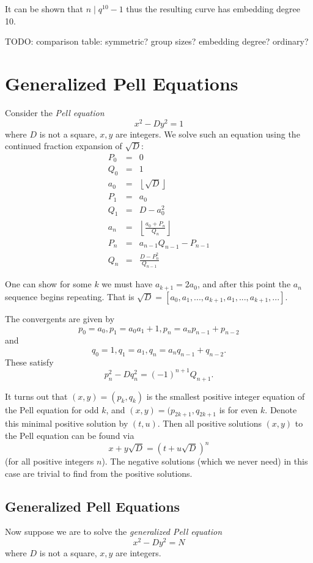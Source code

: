It can be shown that $n \mid q^{10} - 1$ thus the resulting curve has
embedding degree 10.

TODO: comparison table: symmetric? group sizes? embedding degree? ordinary?

\section {Generalized Pell Equations}

Consider the \emph{Pell equation}
\[ x^2 - D y^2 = 1 \]
where $D$ is not a square, $x, y$ are integers.
We solve such an equation using the
continued fraction expansion of $\sqrt{D}$:
\[
\begin{array}{rcl}
P_0 &=& 0 \\
Q_0 &=& 1 \\
a_0 &=& \left\lfloor{\sqrt{D}}\right\rfloor \\
P_1 &=& a_0 \\
Q_1 &=& D-a_0^2 \\
a_n &=& \left\lfloor { \frac {a_0 + P_n}{Q_n} } \right\rfloor \\
P_n &=& a_{n-1} Q_{n-1} - P_{n-1} \\
Q_n &=& \frac{D - P_n^2}{Q_{n-1}}
\end{array}
\]

One can show for some $k$ we must have $a_{k+1} = 2 a_0$, and after
this point the $a_n$ sequence begins repeating. That is
$\sqrt{D} = [a_0, a_1, ..., a_{k+1}, a_1, ..., a_{k+1}, ... ]$.

The convergents are given by
\[ p_0 = a_0, p_1 = a_0 a_1 + 1, p_n = a_n p_{n-1} + p_{n-2} \]
and
\[ q_0 = 1, q_1 = a_1, q_n = a_n q_{n-1} + q_{n-2} .\]
These satisfy
\[ p_n^2 - D q_n^2 = (-1)^{n+1} Q_{n+1} . \]

It turns out that $(x, y) = (p_k, q_k)$ is the smallest positive
integer equation
of the Pell equation for odd $k$, and $(x, y) = (p_{2k+1}, q_{2k+1}$ is for
even $k$. Denote this minimal positive solution by $(t, u)$.
Then all positive solutions $(x, y)$ to the Pell equation can be found via
\[ x + y\sqrt{D} = (t+u\sqrt{D})^n\]
(for all positive integers $n$). The negative solutions (which we
never need) in this case are trivial to find from the positive solutions.

\subsection {Generalized Pell Equations}

Now suppose we are to solve the \emph{generalized Pell equation}
\[ x^2 - D y^2 = N \]
where $D$ is not a square, $x, y$ are integers.

